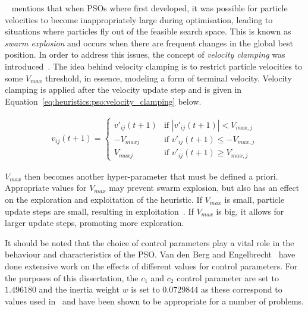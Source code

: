 \noindent
~\citeauthor{ref:vanwyk:2014}\cite{ref:vanwyk:2014} mentions that when \acp{PSO} where first developed, it was possible for particle velocities to become inappropriately large during optimisation, leading to situations where particles fly out of the feasible search space. This is known as \textit{swarm explosion} and occurs when there are frequent changes in the global best position. In order to address this issues, the concept of \textit{velocity clamping} was introduced~\cite{ref:eberhart:1996}. The idea behind velocity clamping is to restrict particle velocities to some $V_{max}$ threshold, in essence, modeling a form of terminal velocity. Velocity clamping is applied after the velocity update step and is given in Equation~\eqref{eq:heuristics:pso:velocity_clamping} below.

\begin{equation}
      \label{eq:heuristics:pso:velocity_clamping}
      \begin{split}
            v_{ij}(t+1)=
            \begin{cases}
                  v'_{ij}(t+1) & \text{if } |v'_{ij}(t+1)| < V_{max,j}   \\
                  -V_{maxj}    & \text{if } v'_{ij}(t+1) \leq -V_{max,j} \\
                  V_{maxj}     & \text{if } v'_{ij}(t+1) \geq V_{max,j}
            \end{cases}
      \end{split}
\end{equation}

\noindent
$V_{max}$ then becomes another hyper-parameter that must be defined a priori. Appropriate values for $V_{max}$ may prevent swarm explosion, but also has an effect on the exploration and exploitation of the heuristic. If $V_{max}$ is small, particle update steps are small, resulting in exploitation~\cite{ref:eberhart:1996}. If $V_{max}$ is big, it allows for larger update steps, promoting more exploration.

It should be noted that the choice of control parameters play a vital role in the behaviour and characteristics of the \acs{PSO}. Van den Berg and Engelbrecht~\cite{ref:vandenberg:2007, ref:vandenberg:2006} have done extensive work on the effects of different values for control parameters. For the purposes of this dissertation, the $c_{1}$ and $c_{2}$ control parameter are set to $1.496180$ and the inertia weight $w$ is set to $0.0729844$ as these correspond to values used in~\cite{ref:eberhart:2000} and have been shown to be appropriate for a number of problems.

